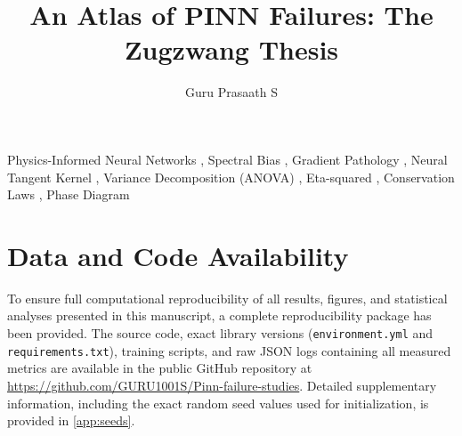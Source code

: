 \documentclass[preprint, review, 12pt]{elsarticle}
\begin{document}
\begin{frontmatter}

\title{An Atlas of PINN Failures: The Zugzwang Thesis}

\author[1]{Guru Prasaath S}

\address[1]{PSG Institute of Technology and Applied Research}




\begin{keyword}
Physics-Informed Neural Networks \sep 
Spectral Bias \sep 
Gradient Pathology \sep 
Neural Tangent Kernel \sep 
Variance Decomposition (ANOVA) \sep 
Eta-squared \sep 
Conservation Laws \sep 
Phase Diagram
\end{keyword}

\end{frontmatter}












\section*{Data and Code Availability}
To ensure full computational reproducibility of all results, figures, and statistical analyses presented in this manuscript, a complete reproducibility package has been provided. The source code, exact library versions (\texttt{environment.yml} and \texttt{requirements.txt}), training scripts, and raw JSON logs containing all measured metrics are available in the public GitHub repository at \url{https://github.com/GURU1001S/Pinn-failure-studies}. Detailed supplementary information, including the exact random seed values used for initialization, is provided in \ref{app:seeds}.




\end{document}
